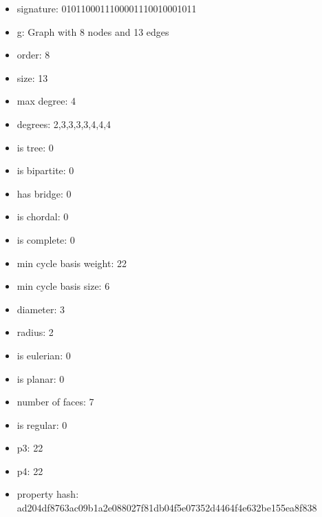 \begin{itemize}
\item signature: 0101100011100001110010001011
\item g: Graph with 8 nodes and 13 edges
\item order: 8
\item size: 13
\item max degree: 4
\item degrees: 2,3,3,3,3,4,4,4
\item is tree: 0
\item is bipartite: 0
\item has bridge: 0
\item is chordal: 0
\item is complete: 0
\item min cycle basis weight: 22
\item min cycle basis size: 6
\item diameter: 3
\item radius: 2
\item is eulerian: 0
\item is planar: 0
\item number of faces: 7
\item is regular: 0
\item p3: 22
\item p4: 22
\item property hash: ad204df8763ac09b1a2e088027f81db04f5e07352d4464f4e632be155ea8f838
\end{itemize}
\newpage
\begin{figure}
\end{figure}
